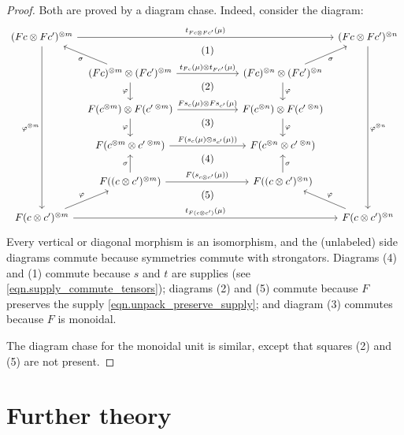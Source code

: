 \documentclass[11pt, oneside, article]{memoir}
\theoremstyle{plain}
\theoremstyle{definition}
\theoremstyle{remark}
\newcommand{\tpow}[1]{^{\otimes #1}}
\begin{document}
\begin{proof}
Both are proved by a diagram chase. Indeed, consider the diagram:
\[
\begin{tikzcd}[column sep=6pt]
	(Fc\otimes Fc')\tpow{m}
		\ar[rrrr, "t_{Fc\otimes Fc'}(\mu)"]
		\ar[ddddd, "\varphi\tpow{m}"']
		\ar[from=dr, "\sigma"]&&[18pt]
		\ar[d, phantom, near start,  "(1)"]&[18pt]&
	(Fc\otimes Fc')\tpow{n}
		\ar[ddddd, "\varphi\tpow{n}"]
		\ar[from=dl, "\sigma"']\\&
	(Fc)\tpow{m}\otimes(Fc')\tpow{m}
		\ar[d, "\varphi"']
		\ar[rr, "t_{Fc}(\mu)\otimes t_{Fc'}(\mu)"]&
		\ar[d, phantom, near start, "(2)"]&
	(Fc)\tpow{n}\otimes(Fc')\tpow{n}
		\ar[d, "\varphi"]\\&
	F(c\tpow{m})\otimes F(c'\,\tpow{m})
		\ar[rr, "Fs_c(\mu)\otimes Fs_{c'}(\mu)"]
		\ar[d, "\varphi"']&
		\ar[d, phantom, near start, "(3)"]&
	F(c\tpow{n})\otimes F(c'\,\tpow{n})
		\ar[d, "\varphi"]\\&
	F(c\tpow{m}\otimes c'\,\tpow{m})
		\ar[rr, "F(s_c(\mu)\otimes s_{c'}(\mu))"]&
		\ar[d, phantom, near start, "(4)"]&
	F(c\tpow{n}\otimes c'\,\tpow{n})\\&
	F((c\otimes c')\tpow{m})
		\ar[u, "\sigma"]
		\ar[rr, "F(s_{c\otimes c'}(\mu))"]&
		\ar[d, phantom, near start, "(5)"]&
	F((c\otimes c')\tpow{n})
		\ar[u, "\sigma"']\\
	F(c\otimes c')\tpow{m}
		\ar[rrrr, "t_{F(c\otimes c')}(\mu)"]
		\ar[ur, "\varphi"]&&~&&
	F(c\otimes c')\tpow{n}
		\ar[ul, "\varphi"']
\end{tikzcd}
\]
Every vertical or diagonal morphism is an isomorphism, and the (unlabeled) side diagrams commute because symmetries commute with strongators. Diagrams (4) and (1) commute because $s$ and $t$ are supplies (see \cref{eqn.supply_commute_tensors}); diagrams (2) and (5) commute because $F$ preserves the supply \eqref{eqn.unpack_preserve_supply}; and diagram (3) commutes because $F$ is monoidal.

The diagram chase for the monoidal unit is similar, except that squares (2) and (5) are not present.
\end{proof}

\section{Further theory}\label{sec.further_theory}
\end{document}
